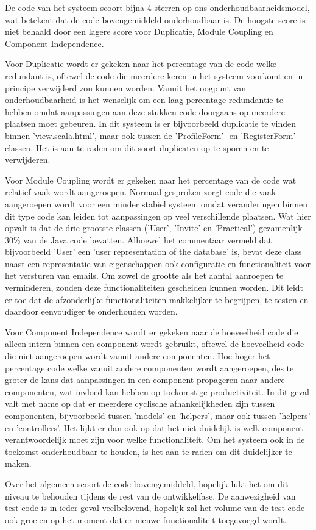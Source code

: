 De code van het systeem scoort bijna 4 sterren op ons onderhoudbaarheidsmodel, wat betekent dat de code bovengemiddeld onderhoudbaar is. De hoogste score is niet behaald door een lagere score voor Duplicatie, Module Coupling en Component Independence.

Voor Duplicatie wordt er gekeken naar het percentage van de code welke redundant is, oftewel de code die meerdere keren in het systeem voorkomt en in principe verwijderd zou kunnen worden.
Vanuit het oogpunt van onderhoudbaarheid is het wenselijk om een laag percentage redundantie te hebben omdat aanpassingen aan deze stukken code doorgaans op meerdere plaatsen moet gebeuren. In dit systeem is er bijvoorbeeld duplicatie te vinden binnen 'view.scala.html', maar ook tussen de 'ProfileForm'- en 'RegisterForm'-classen.
Het is aan te raden om dit soort duplicaten op te sporen en te verwijderen. 

Voor Module Coupling wordt er gekeken naar het percentage van de code wat relatief vaak wordt aangeroepen.
Normaal gesproken zorgt code die vaak aangeroepen wordt voor een minder stabiel systeem omdat veranderingen binnen dit type code kan leiden tot aanpassingen op veel verschillende plaatsen.
Wat hier opvalt is dat de drie grootste classen ('User', 'Invite' en 'Practical') gezamenlijk 30\% van de Java code bevatten.
Alhoewel het commentaar vermeld dat bijvoorbeeld 'User' een 'user representation of the database' is, bevat deze class naast een representatie van eigenschappen ook configuratie en functionaliteit voor het versturen van emails.
Om zowel de grootte als het aantal aanroepen te verminderen, zouden deze functionaliteiten gescheiden kunnen worden.
Dit leidt er toe dat de afzonderlijke functionaliteiten makkelijker te begrijpen, te testen en daardoor eenvoudiger te onderhouden worden.

Voor Component Independence wordt er gekeken naar de hoeveelheid code die alleen intern binnen een component wordt gebruikt, oftewel de hoeveelheid code die niet aangeroepen wordt vanuit andere componenten.
Hoe hoger het percentage code welke vanuit andere componenten wordt aangeroepen, des te groter de kans dat aanpassingen in een component propageren naar andere componenten, wat invloed kan hebben op toekomstige productiviteit.
In dit geval valt met name op dat er meerdere cyclische afhankelijkheden zijn tussen componenten, bijvoorbeeld tussen 'models' en 'helpers', maar ook tussen 'helpers' en 'controllers'.
Het lijkt er dan ook op dat het niet duidelijk is welk component verantwoordelijk moet zijn voor welke functionaliteit.
Om het systeem ook in de toekomst onderhoudbaar te houden, is het aan te raden om dit duidelijker te maken.

Over het algemeen scoort de code bovengemiddeld, hopelijk lukt het om dit niveau te behouden tijdens de rest van de ontwikkelfase.
De aanwezigheid van test-code is in ieder geval veelbelovend, hopelijk zal het volume van de test-code ook groeien op het moment dat er nieuwe functionaliteit toegevoegd wordt. 